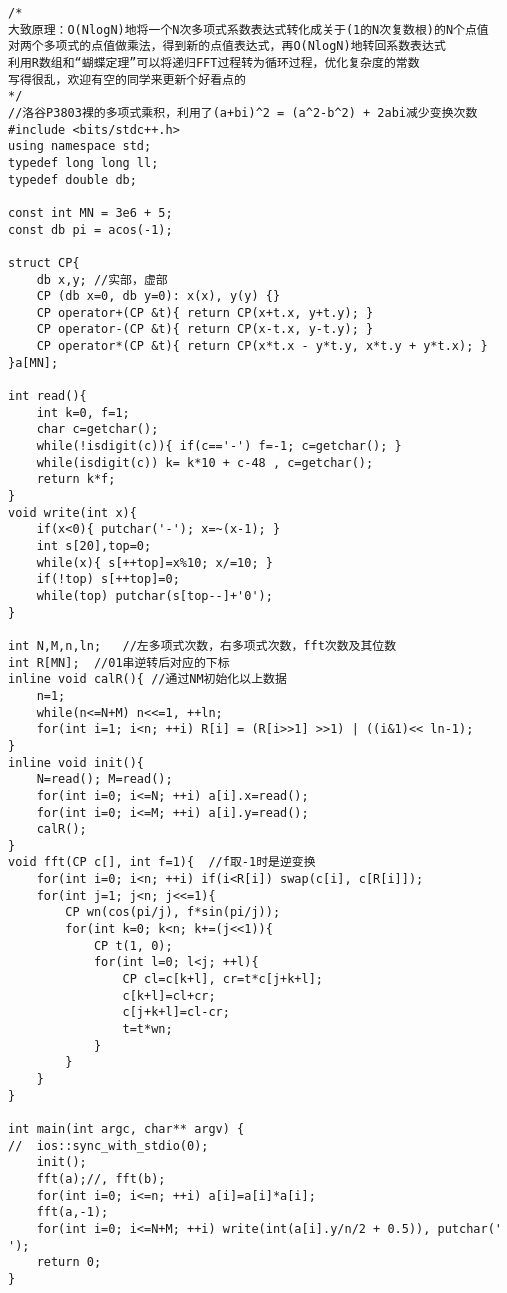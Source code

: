 \begin{lstlisting}
/* 
大致原理：O(NlogN)地将一个N次多项式系数表达式转化成关于(1的N次复数根)的N个点值
对两个多项式的点值做乘法，得到新的点值表达式，再O(NlogN)地转回系数表达式
利用R数组和“蝴蝶定理”可以将递归FFT过程转为循环过程，优化复杂度的常数
写得很乱，欢迎有空的同学来更新个好看点的
*/
//洛谷P3803裸的多项式乘积，利用了(a+bi)^2 = (a^2-b^2) + 2abi减少变换次数
#include <bits/stdc++.h>
using namespace std;
typedef long long ll;
typedef double db;
 
const int MN = 3e6 + 5;
const db pi = acos(-1);

struct CP{
	db x,y;	//实部，虚部
	CP (db x=0, db y=0): x(x), y(y) {}
	CP operator+(CP &t){ return CP(x+t.x, y+t.y); }
	CP operator-(CP &t){ return CP(x-t.x, y-t.y); }
	CP operator*(CP &t){ return CP(x*t.x - y*t.y, x*t.y + y*t.x); }
}a[MN];

int read(){
	int k=0, f=1;
	char c=getchar();
	while(!isdigit(c)){ if(c=='-') f=-1; c=getchar(); }
	while(isdigit(c)) k= k*10 + c-48 , c=getchar();
	return k*f;
}
void write(int x){
	if(x<0){ putchar('-'); x=~(x-1); }
	int s[20],top=0;
	while(x){ s[++top]=x%10; x/=10; }
	if(!top) s[++top]=0;
	while(top) putchar(s[top--]+'0');
}

int N,M,n,ln;	//左多项式次数，右多项式次数，fft次数及其位数
int R[MN];	//01串逆转后对应的下标
inline void calR(){	//通过NM初始化以上数据
	n=1;
	while(n<=N+M) n<<=1, ++ln;
	for(int i=1; i<n; ++i) R[i] = (R[i>>1] >>1) | ((i&1)<< ln-1);
}
inline void init(){
	N=read(); M=read();
	for(int i=0; i<=N; ++i) a[i].x=read();
	for(int i=0; i<=M; ++i) a[i].y=read();
	calR();
}
void fft(CP c[], int f=1){	//f取-1时是逆变换
	for(int i=0; i<n; ++i) if(i<R[i]) swap(c[i], c[R[i]]);
	for(int j=1; j<n; j<<=1){
		CP wn(cos(pi/j), f*sin(pi/j));
		for(int k=0; k<n; k+=(j<<1)){
			CP t(1, 0);
			for(int l=0; l<j; ++l){
				CP cl=c[k+l], cr=t*c[j+k+l];
				c[k+l]=cl+cr;
				c[j+k+l]=cl-cr;
				t=t*wn;
			}
		}
	}
}

int main(int argc, char** argv) {
//	ios::sync_with_stdio(0);
	init();
	fft(a);//, fft(b);
	for(int i=0; i<=n; ++i) a[i]=a[i]*a[i];
	fft(a,-1);
	for(int i=0; i<=N+M; ++i) write(int(a[i].y/n/2 + 0.5)), putchar(' ');
	return 0;
}
\end{lstlisting}